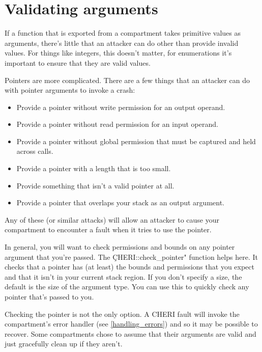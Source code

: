 \section{Validating arguments}


If a function that is exported from a compartment takes primitive values as arguments, there's little that an attacker can do other than provide invalid values.
For things like integers, this doesn't matter, for enumerations it's important to ensure that they are valid values.

Pointers are more complicated.
There are a few things that an attacker can do with pointer arguments to invoke a crash:

\begin{itemize}
	\item{Provide a pointer without write permission for an output operand.}
	\item{Provide a pointer without read permission for an input operand.}
	\item{Provide a pointer without global permission that must be captured and held across calls.}
	\item{Provide a pointer with a length that is too small.}
	\item{Provide something that isn't a valid pointer at all.}
	\item{Provide a pointer that overlaps your stack as an output argument.}
\end{itemize}

Any of these (or similar attacks) will allow an attacker to cause your compartment to encounter a fault when it tries to use the pointer.

In general, you will want to check permissions and bounds on any pointer argument that you're passed.
The \c{CHERI::check_pointer"} function helps here.
It checks that a pointer has (at least) the bounds and permissions that you expect and that it isn't in your current stack region.
If you don't specify a size, the default is the size of the argument type.
You can use this to quickly check any pointer that's passed to you.

\begin{note}
Checking the pointer is not the only option.
A CHERI fault will invoke the compartment's error handler (see \ref{handling_errors}) and so it may be possible to recover.
Some compartments chose to assume that their arguments are valid and just gracefully clean up if they aren't.
\end{note}

